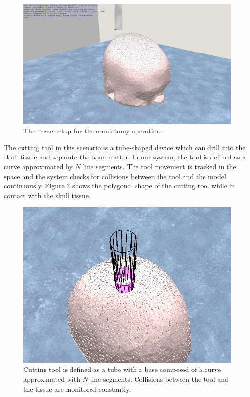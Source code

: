 \begin{figure}[H]
  \centering
  \includegraphics[width=0.7\linewidth]{figures/evaluation/craniotomy01.png}
  \caption{\label{fig:craniotomy01}
  {The scene setup for the craniotomy operation.}
}
\end{figure}


The cutting tool in this scenario is a tube-shaped device which can drill into the skull tissue and separate the bone matter.
In our system, the tool is defined as a curve approximated by $N$ line segments. The tool movement is tracked in the space 
and the system checks for collisions between the tool and the model continuously. Figure \ref{fig:craniotomytube} shows the 
polygonal shape of the cutting tool while in contact with the skull tissue.

\begin{figure}[H]
  \centering
  \includegraphics[width=0.6\linewidth]{figures/evaluation/craniotomytube.png}
  \caption{\label{fig:craniotomytube}
  {Cutting tool is defined as a tube with a base composed of a curve approximated with $N$ line segments. 
  Collisions between the tool and the tissue are monitored constantly.}
}
\end{figure}

